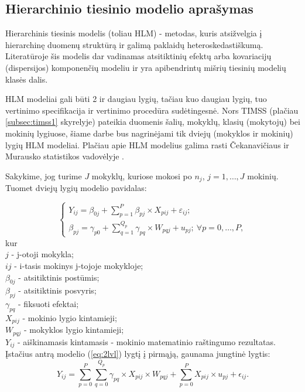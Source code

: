 \documentclass[12pt,a4paper]{article}
\begin{document}
\subsection{Hierarchinio tiesinio modelio aprašymas}
\indent Hierarchinis tiesinis modelis (toliau HLM) - metodas, kuris atsižvelgia į hierarchinę duomenų struktūrą ir galimą paklaidų heteroskedastiškumą. Literatūroje šis modelis dar vadinamas atsitiktinių efektų arba kovariacijų (dispersijos) komponenčių modeliu ir yra apibendrintų mišrių tiesinių modelių klasės dalis\cite{hlmmixed}.

\indent HLM modeliai gali būti 2 ir daugiau lygių, tačiau kuo daugiau lygių, tuo vertinimo specifikacija ir vertinimo procedūra sudėtingesnė. Nors TIMSS (plačiau \ref{subsec:timss1} skyrelyje) pateikia duomenis šalių, mokyklų, klasių (mokytojų) bei mokinių lygiuose, šiame darbe bus nagrinėjami tik dviejų (mokyklos ir mokinių) lygių HLM modeliai. Plačiau apie HLM modelius galima rasti Čekanavičiaus ir Murausko statistikos vadovėlyje \cite{cek}.

\indent Sakykime, jog turime $J$ mokyklų, kuriose mokosi po $n_j$, $j = 1,\dots,J$ mokinių. Tuomet dviejų lygių modelio pavidalas:

\begin{equation} \label{eq:2lvl}
\left\{
\begin{array}{l}
Y_{ij} = \beta_{0j}+\sum^P_{p = 1} \beta_{pj}\times X_{pij}+\varepsilon_{ij}; \\
\beta_{pj} = \gamma_{p0} + \sum^{Q_p}_{q=1}\gamma_{pq}\times W_{pqj}+u_{pj};\ \forall p = 0 , \dots, P,
\end{array} \right.
\end{equation}
kur\\
$j$ - j-otoji mokykla;\\
$ij$ - i-tasis mokinys j-tojoje mokykloje;\\
$\beta_{0j}$ - atsitiktinis postūmis;\\
$\beta_{pj}$ - atsitiktinis posvyris;\\
$\gamma_{pq}$ - fiksuoti efektai;\\
$X_{pij}$ - mokinio lygio kintamieji;\\
$W_{pqj}$ - mokyklos lygio kintamieji;\\
$Y_{ij}$ - aiškinamasis kintamasis - mokinio matematinio raštingumo rezultatas.\\

\indent Įstačius antrą modelio (\ref{eq:2lvl}) lygtį į pirmąją, gaunama jungtinė lygtis:
\begin{equation} \label{eq:2lvljung}
Y_{ij} =\sum^P_{p = 0} \sum^{Q_p}_{q=0}\gamma_{pq}\times X_{pij}\times W_{pqj}+\sum^P_{p = 0} X_{pij}\times u_{pj}+\epsilon_{ij}.
\end{equation}
\end{document}
